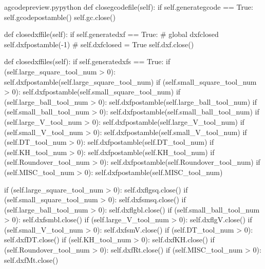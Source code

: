 \documentclass{ltxdoc}
\begin{document}
\lstset{firstnumber=\thegcpy}
\begin{writecode}{a}{gcodepreview.py}{python}
    def closegcodefile(self):
        if self.generategcode == True:
            self.gcodepostamble()
            self.gc.close()

    def closedxffile(self):
        if self.generatedxf == True:
#            global dxfclosed
            self.dxfpostamble(-1)
#            self.dxfclosed = True
            self.dxf.close()
    
    def closedxffiles(self):
        if self.generatedxfs == True:
            if (self.large_square_tool_num > 0):
                self.dxfpostamble(self.large_square_tool_num)
            if (self.small_square_tool_num > 0):
                self.dxfpostamble(self.small_square_tool_num)
            if (self.large_ball_tool_num > 0):
                self.dxfpostamble(self.large_ball_tool_num)
            if (self.small_ball_tool_num > 0):
                self.dxfpostamble(self.small_ball_tool_num)
            if (self.large_V_tool_num > 0):
                self.dxfpostamble(self.large_V_tool_num)
            if (self.small_V_tool_num > 0):
                self.dxfpostamble(self.small_V_tool_num)
            if (self.DT_tool_num > 0):
                self.dxfpostamble(self.DT_tool_num)
            if (self.KH_tool_num > 0):
                self.dxfpostamble(self.KH_tool_num)
            if (self.Roundover_tool_num > 0):
                self.dxfpostamble(self.Roundover_tool_num)
            if (self.MISC_tool_num > 0):
                self.dxfpostamble(self.MISC_tool_num)
                
            if (self.large_square_tool_num > 0):
                self.dxflgsq.close()
            if (self.small_square_tool_num > 0):
                self.dxfsmsq.close()
            if (self.large_ball_tool_num > 0):
                self.dxflgbl.close()
            if (self.small_ball_tool_num > 0):
                self.dxfsmbl.close()
            if (self.large_V_tool_num > 0):
                self.dxflgV.close()
            if (self.small_V_tool_num > 0):
                self.dxfsmV.close()
            if (self.DT_tool_num > 0):
                self.dxfDT.close()
            if (self.KH_tool_num > 0):
                self.dxfKH.close()
            if (self.Roundover_tool_num > 0):
                self.dxfRt.close()
            if (self.MISC_tool_num > 0):
                self.dxfMt.close()

\end{writecode}
\addtocounter{gcpy}{56}
%
\end{document}
